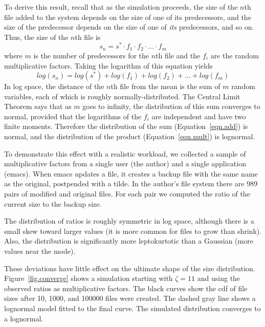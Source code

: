 \documentclass[10pt,twocolumn]{article}
\begin{document}
To derive this result, recall that as the simulation proceeds,
the size of the $n$th file added to the system depends
on the size of one of its predecessors, and the size of the
predecessor depends on the size of one of {\em its} predecessors, and
so on.  Thus, the size of the $n$th file is
%
\begin{equation}
s_n = s^* \cdot f_1 \cdot f_2 \cdot ... \cdot f_m
\label{eqn.mult}
\end{equation}
%
where $m$ is the number of predecessors for the $n$th file and
the $f_i$ are the random multiplicative factors.
Taking the logarithm of this equation yields
%
\begin{equation}
log(s_n) = log(s^*) + log(f_1) + log(f_2) + ... + log(f_m)
\label{eqn.add}
\end{equation}
%
In log space, the distance of the $n$th file from the mean is the sum
of $m$ random variables, each of which is roughly
normally-distributed.  The Central Limit Theorem says that as $m$ goes
to infinity, the distribution of this sum converges to normal,
provided that the logarithms of the $f_i$ are independent and have
two finite moments.  Therefore the distribution of the
sum (Equation~\ref{eqn.add}) is normal, and the distribution of the
product (Equation~\ref{eqn.mult}) is lognormal.

To demonstrate this effect with a realistic workload,
we collected a sample of multiplicative factors from a
single user (the author) and a single application (emacs).  When emacs
updates a file, it creates a backup file with the same name as the
original, postpended with a tilde.  In the author's file system there
are 989 pairs of modified and original files.  For each pair we
computed the ratio of the current size to the backup size.

The distribution of ratios is roughly symmetric
in log space, although there is a small skew toward larger values (it
is more common for files to grow than shrink).  Also, the distribution
is significantly more leptokurtotic than a Gaussian (more values near
the mode).

These deviations have little effect on the ultimate
shape of the size distribution.  Figure~\ref{fig.converge} shows a
simulation starting with $\zeta = 11$ and using the observed ratios as
multiplicative factors.  The black curves show the cdf of file sizes
after 10, 1000, and 100000 files were created.  The dashed gray line
shows a lognormal model fitted to the final curve.  The
simulated distribution converges to a lognormal.
\end{document}
